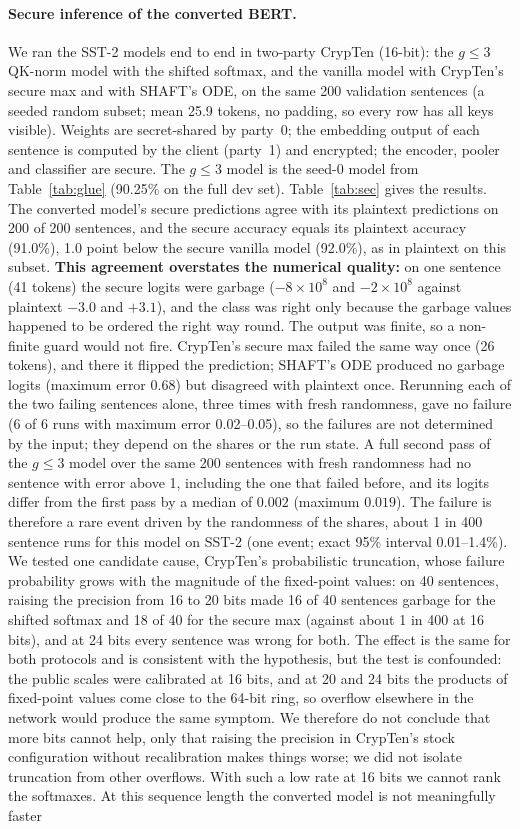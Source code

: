 \documentclass[11pt]{article}
\begin{document}
\paragraph{Secure inference of the converted BERT.} We ran the SST-2 models end to end in two-party CrypTen (16-bit): the
$g\le3$ QK-norm model with the shifted softmax, and the vanilla model with CrypTen's secure max and with SHAFT's ODE, on the same
200 validation sentences (a seeded random subset; mean 25.9 tokens, no padding, so every row has all keys visible). Weights are
secret-shared by party~0; the embedding output of each sentence is computed by the client (party~1) and encrypted; the encoder,
pooler and classifier are secure. The $g\le3$ model is the seed-0 model from Table~\ref{tab:glue} (90.25\% on the full dev set).
Table~\ref{tab:sec} gives the results. The converted model's secure predictions agree with its plaintext predictions on 200 of
200 sentences, and the secure accuracy equals its plaintext accuracy (91.0\%), 1.0 point below the secure vanilla model (92.0\%),
as in plaintext on this subset. \textbf{This agreement overstates the numerical quality:} on one sentence (41 tokens) the secure
logits were garbage ($-8\times10^{8}$ and $-2\times10^{8}$ against plaintext $-3.0$ and $+3.1$), and the class was right only
because the garbage values happened to be ordered the right way round. The output was finite, so a non-finite guard would not
fire. CrypTen's secure max failed the same way once (26 tokens), and there it flipped the prediction; SHAFT's ODE produced no
garbage logits (maximum error 0.68) but disagreed with plaintext once. Rerunning each of the two failing sentences alone, three times with fresh randomness, gave no failure (6 of 6 runs with maximum error
0.02--0.05), so the failures are not determined by the input; they depend on the shares or the run state. A full second pass of the $g\le3$ model over the same 200 sentences with fresh randomness had no sentence with error above 1, including
the one that failed before, and its logits differ from the first pass by a median of $0.002$ (maximum $0.019$). The failure is therefore a rare event driven by the
randomness of the shares, about 1 in 400 sentence runs for this model on SST-2 (one event; exact 95\% interval 0.01--1.4\%). We tested one candidate cause, CrypTen's probabilistic truncation, whose failure probability grows with the magnitude of the fixed-point values: on 40 sentences, raising the precision from 16 to 20 bits made 16 of 40 sentences garbage for the shifted softmax and 18 of 40 for the secure max (against about 1 in 400 at 16 bits), and at 24 bits every sentence was wrong for both. The effect is the same for both protocols and is consistent with the hypothesis, but the test is confounded: the public scales were calibrated at 16 bits, and at 20 and 24 bits the products of fixed-point values come close to the 64-bit ring, so overflow elsewhere in the network would produce the same symptom. We therefore do not conclude that more bits cannot help, only that raising the precision in CrypTen's stock configuration without recalibration makes things worse; we did not isolate truncation from other overflows. With such a low rate at 16 bits we cannot rank the softmaxes. At this sequence length the converted model is not meaningfully faster
\end{document}
